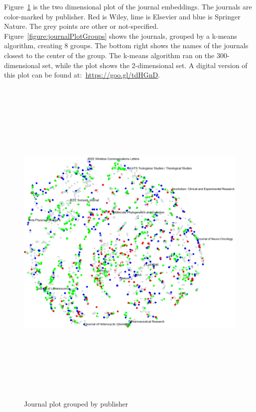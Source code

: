 \documentclass[../../Thesis.tex]{subfiles}
\begin{document}
Figure~\ref{figure:journalPlotNormal} is the two dimensional plot of the journal embeddings. The journals are color-marked by publisher. Red is Wiley, lime is Elsevier and blue is Springer Nature. The grey points are other or not-specified.
Figure~\ref{figure:journalPlotGroups} shows the journals, grouped by a k-means algorithm, creating 8 groups. The bottom right shows the names of the journals closest to the center of the group. The k-means algorithm ran on the 300-dimensional set, while the plot shows the 2-dimensional set. A digital version of this plot can be found at:~\url{https://goo.gl/tdHGnD}.
\begin{landscape}
\begin{figure}
\begin{center}
\includegraphics[height=6.5in]{Plots/journal_plot_normal}
\end{center}
\caption{Journal plot grouped by publisher}\label{figure:journalPlotNormal}
\end{figure}
\end{landscape}
\end{document}
